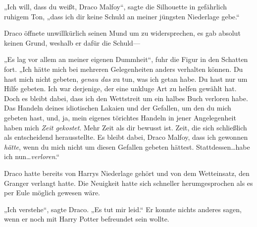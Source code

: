 „Ich will, dass du weißt, Draco Malfoy“, sagte die Silhouette in gefährlich ruhigem Ton, „dass ich dir keine Schuld an meiner jüngsten Niederlage gebe.“

Draco öffnete unwillkürlich seinen Mund um zu widersprechen, es gab absolut keinen Grund, weshalb er dafür die Schuld—

„Es lag vor allem an meiner eigenen Dummheit“, fuhr die Figur in den Schatten fort. „Ich hätte mich bei mehreren Gelegenheiten anders verhalten können. Du hast mich nicht gebeten, \emph{genau das} zu tun, was ich getan habe. Du hast nur um Hilfe gebeten. Ich war derjenige, der eine unkluge Art zu helfen gewählt hat. Doch es bleibt dabei, dass ich den Wettstreit um ein halbes Buch verloren habe. Das Handeln deines idiotischen Lakaien und der Gefallen, um den du mich gebeten hast, und, ja, mein eigenes törichtes Handeln in jener Angelegenheit haben mich \emph{Zeit gekostet}. Mehr Zeit als dir bewusst ist. Zeit, die sich schließlich als entscheidend herausstellte. Es bleibt dabei, Draco Malfoy, dass ich gewonnen \emph{hätte}, wenn du mich nicht um diesen Gefallen gebeten hättest. Stattdessen…habe ich nun…\emph{verloren}.“

Draco hatte bereits von Harrys Niederlage gehört und von dem Wetteinsatz, den Granger verlangt hatte. Die Neuigkeit hatte sich schneller herumgesprochen als es per Eule möglich gewesen wäre.

„Ich verstehe“, sagte Draco. „Es tut mir leid.“ Er konnte nichts anderes sagen, wenn er noch mit Harry Potter befreundet sein wollte.

